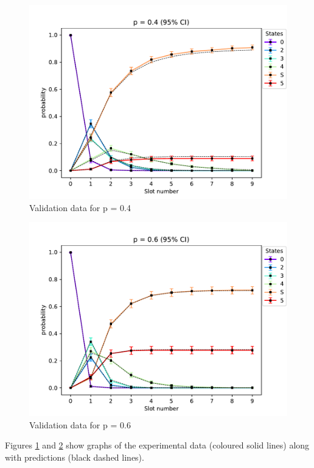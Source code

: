 \begin{figure}[H]
    \begin{center}
        \includegraphics[scale=0.73]{img/star5to1p=0.4validation.pdf}
        \caption{Validation data for p = 0.4}
        \label{fig:5to1validPlot1}
    \end{center}
    \vspace*{-0.8cm}
\end{figure}


\begin{figure}[H]
    \begin{center}
        \includegraphics[scale=0.73]{img/star5to1p=0.6validation.pdf}
        \caption{Validation data for p = 0.6}
        \label{fig:5to1validPlot2}
    \end{center}
    \vspace*{-0.8cm}
\end{figure}

Figures \ref{fig:5to1validPlot1} and \ref{fig:5to1validPlot2} show graphs of the experimental data (coloured solid lines) along with predictions (black dashed lines).
